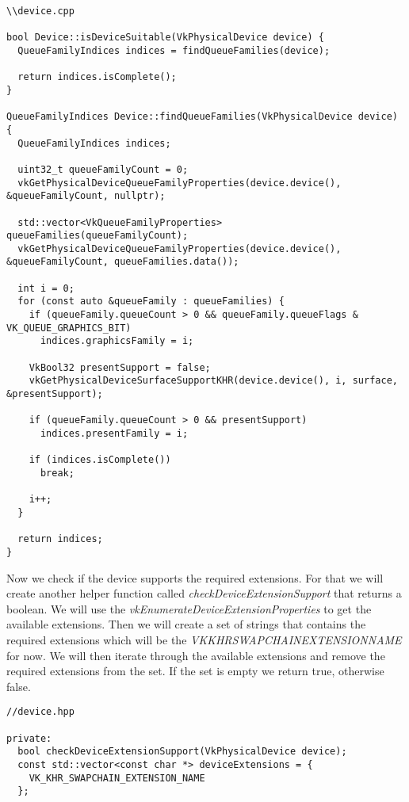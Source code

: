 \documentclass[12pt]{report} \usepackage{preamble}
\begin{document}
\begin{lstlisting}[Language=C++]
\\device.cpp

bool Device::isDeviceSuitable(VkPhysicalDevice device) {
  QueueFamilyIndices indices = findQueueFamilies(device);

  return indices.isComplete();
}

QueueFamilyIndices Device::findQueueFamilies(VkPhysicalDevice device) {
  QueueFamilyIndices indices;

  uint32_t queueFamilyCount = 0;
  vkGetPhysicalDeviceQueueFamilyProperties(device.device(), &queueFamilyCount, nullptr);

  std::vector<VkQueueFamilyProperties> queueFamilies(queueFamilyCount);
  vkGetPhysicalDeviceQueueFamilyProperties(device.device(), &queueFamilyCount, queueFamilies.data());

  int i = 0;
  for (const auto &queueFamily : queueFamilies) {
    if (queueFamily.queueCount > 0 && queueFamily.queueFlags & VK_QUEUE_GRAPHICS_BIT)
      indices.graphicsFamily = i;

    VkBool32 presentSupport = false;
    vkGetPhysicalDeviceSurfaceSupportKHR(device.device(), i, surface, &presentSupport);

    if (queueFamily.queueCount > 0 && presentSupport)
      indices.presentFamily = i;

    if (indices.isComplete())
      break;

    i++;
  }

  return indices;
}
\end{lstlisting}

Now we check if the device supports the required extensions. For that we will create another helper function
called \textit{checkDeviceExtensionSupport} that returns a boolean. We will use the \textit{vkEnumerateDeviceExtensionProperties}
to get the available extensions. Then we will create a set of strings that contains the required extensions which will be the
\textit{VK\textunderscore KHR\textunderscore SWAPCHAIN\textunderscore EXTENSION\textunderscore NAME} for now. We will then iterate through
the available extensions and remove the required extensions from the set. If the set is empty we return true, otherwise false.

\begin{lstlisting}[Language=C++]
//device.hpp

private:
  bool checkDeviceExtensionSupport(VkPhysicalDevice device);
  const std::vector<const char *> deviceExtensions = {
    VK_KHR_SWAPCHAIN_EXTENSION_NAME
  };
\end{lstlisting}
\end{document}
